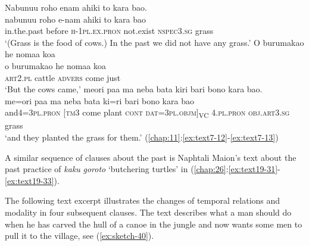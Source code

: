 \documentclass[output=paper]{langscibook}
\begin{document}
\ea\label{ex:sketch-39}
    \ea\label{ex:sketch-39a}
        Nabunuu roho enam ahiki to kara bao.\\
        \gll nabunuu roho e-nam ahiki to {kara bao}\footnotemark\\
        in.the.past before \textsc{h}-1\textsc{pl}.\textsc{ex}.\textsc{pron} not.exist \textsc{nspec}3.\textsc{sg} grass\\
        \glt `(Grass is the food of cows.) In the past we did not have any grass.'
    \ex\label{ex:sketch-39b}
        O burumakao he nomaa koa\\
        \gll o burumakao he nomaa koa\\
        \textsc{art}2.\textsc{pl} cattle \textsc{advers} come just\\
        \glt `But the cows came,'
    \ex\label{ex:sketch-39c}
        meori paa ma neba bata kiri bari bono kara bao.\\
        \gll me=ori paa ma neba bata ki=ri bari bono {kara bao}\\
        and4=3\textsc{pl}.\textsc{pron}	[\textsc{tm}3 come plant \textsc{cont} \textsc{dat}=3\textsc{pl}.\textsc{objm}]\textsubscript{VC}	4.\textsc{pl}.\textsc{pron} \textsc{obj}.\textsc{art}3.\textsc{sg} grass\\
        \glt `and they planted the grass for them.' (\ref{chap:11}:\ref{ex:text7-12}-\ref{ex:text7-13})
    \z
\z{}

A similar sequence of clauses about the past is Naphtali Maion's text about the past practice of \textit{kaku} \textit{goroto} `butchering turtles' in (\ref{chap:26}:\ref{ex:text19-31}-\ref{ex:text19-33}).

The following text excerpt illustrates the changes of temporal relations and modality in four subsequent clauses. The text describes what a man should do when he has carved the hull of a canoe in the jungle and now wants some men to pull it to the village, see (\ref{ex:sketch-40}).
\end{document}
